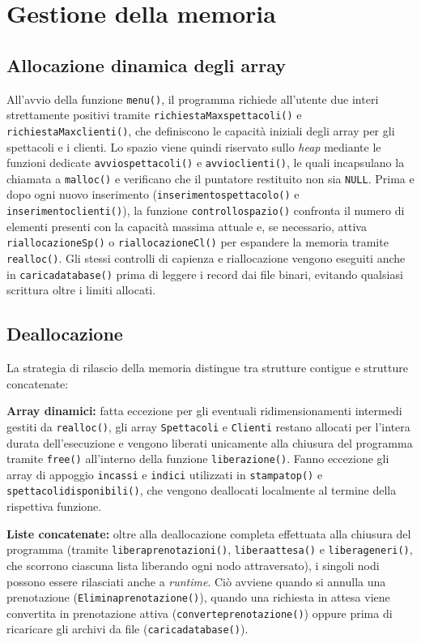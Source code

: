 \documentclass[11pt,a4paper,oneside,openany]{book}
\newenvironment{listacomp}{%
    \small
    \begin{list}{\textendash}{%
        \setlength{\topsep}{2pt}%
        \setlength{\partopsep}{0pt}%
        \setlength{\itemsep}{1pt}%
        \setlength{\parsep}{0pt}%
        \setlength{\leftmargin}{1.2em}%
    }%
}{%
    \end{list}%
}
\begin{document}
\section{Gestione della memoria}
\subsection{Allocazione dinamica degli array}
All'avvio della funzione \texttt{menu()}, il programma richiede all'utente due interi strettamente positivi tramite \texttt{richiestaMaxspettacoli()} e \texttt{richiestaMaxclienti()}, che definiscono le capacità iniziali degli array per gli spettacoli e i clienti. Lo spazio viene quindi riservato sullo \emph{heap} mediante le funzioni dedicate \texttt{avviospettacoli()} e \texttt{avvioclienti()}, le quali incapsulano la chiamata a \texttt{malloc()} e verificano che il puntatore restituito non sia \texttt{NULL}. Prima e dopo ogni nuovo inserimento (\texttt{inserimentospettacolo()} e \texttt{inserimentoclienti()}), la funzione \texttt{controllospazio()} confronta il numero di elementi presenti con la capacità massima attuale e, se necessario, attiva \texttt{riallocazioneSp()} o \texttt{riallocazioneCl()} per espandere la memoria tramite \texttt{realloc()}. Gli stessi controlli di capienza e riallocazione vengono eseguiti anche in \texttt{caricadatabase()} prima di leggere i record dai file binari, evitando qualsiasi scrittura oltre i limiti allocati.

\subsection{Deallocazione}
La strategia di rilascio della memoria distingue tra strutture contigue e strutture concatenate:
\begin{listacomp}
    \item \textbf{Array dinamici:} fatta eccezione per gli eventuali ridimensionamenti intermedi gestiti da \texttt{realloc()}, gli array \texttt{Spettacoli} e \texttt{Clienti} restano allocati per l'intera durata dell'esecuzione e vengono liberati unicamente alla chiusura del programma tramite \texttt{free()} all'interno della funzione \texttt{liberazione()}. Fanno eccezione gli array di appoggio \texttt{incassi} e \texttt{indici} utilizzati in \texttt{stampatop()} e \texttt{spettacolidisponibili()}, che vengono deallocati localmente al termine della rispettiva funzione.
    \item \textbf{Liste concatenate:} oltre alla deallocazione completa effettuata alla chiusura del programma (tramite \texttt{liberaprenotazioni()}, \texttt{liberaattesa()} e \texttt{liberageneri()}, che scorrono ciascuna lista liberando ogni nodo attraversato), i singoli nodi possono essere rilasciati anche a \emph{runtime}. Ciò avviene quando si annulla una prenotazione (\texttt{Eliminaprenotazione()}), quando una richiesta in attesa viene convertita in prenotazione attiva (\texttt{converteprenotazione()}) oppure prima di ricaricare gli archivi da file (\texttt{caricadatabase()}).
\end{listacomp}
\end{document}

